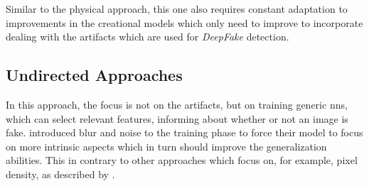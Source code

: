 \par
Similar to the physical approach, this one also requires constant adaptation to
improvements in the creational models which only need to improve to incorporate
dealing with the artifacts which are used for \textit{DeepFake} detection\cite{mirsky_creation_2020}.

\subsection{Undirected Approaches}
In this approach, the focus is not on the artifacts, but on training generic
\glspl{nn}, which can select relevant features, informing about whether or not
an image is fake. 
\textcite{xuan_generalization_2019} introduced blur and noise to the training phase
to force their model to focus on more intrinsic aspects which in turn should improve
the generalization abilities.
This in contrary to other approaches which focus on, for example, pixel density,
as described by \textcite{mirsky_creation_2020}.



